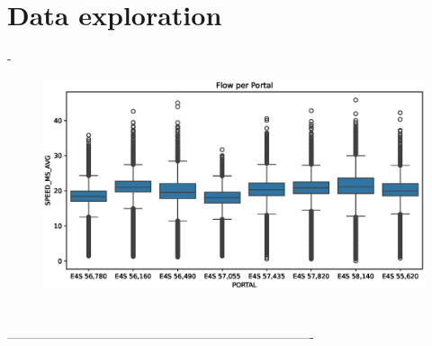 \section{Data exploration}
-
\begin{figure}
	\centering
	\includegraphics{screenshots/avg_speed_portal.eps}
\end{figure}


\section{}


-------------------------------------------------------------------------%

\newpage
%
%
%
%



%


